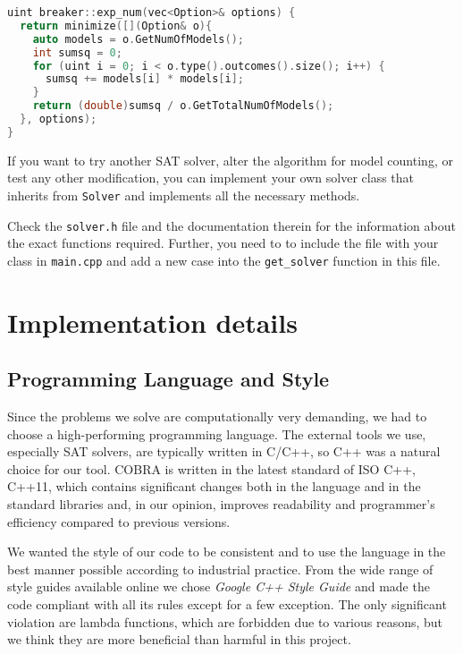 \begin{lstlisting}[language=C++]
uint breaker::exp_num(vec<Option>& options) {
  return minimize([](Option& o){
    auto models = o.GetNumOfModels();
    int sumsq = 0;
    for (uint i = 0; i < o.type().outcomes().size(); i++) {
      sumsq += models[i] * models[i];
    }
    return (double)sumsq / o.GetTotalNumOfModels();
  }, options);
}
\end{lstlisting}

If you want to try another SAT solver, alter the algorithm for model counting,
  or test any other modification,
  you can implement your own solver class that inherits from \texttt{Solver} and
  implements all the necessary methods.

Check the \texttt{solver.h} file and the documentation therein
  for the information about the exact functions required.
Further, you need to to include the file with your class in
  \texttt{main.cpp} and add a new case
  into the \texttt{get\_solver} function in this file.

\section{Implementation details}

\subsection{Programming Language and Style}

Since the problems we solve are computationally very demanding,
  we had to choose a high-performing programming language.
The external tools we use, especially SAT solvers, are typically written in C/C++,
  so C++ was a natural choice for our tool.
COBRA is written in the latest standard of ISO C++, C++11, which
  contains significant changes both in the language and in the standard libraries
  and, in our opinion, improves readability and programmer's efficiency
  compared to previous versions.

We wanted the style of our code to be consistent and to use
  the language in the best manner possible according to industrial practice.
From the wide range of style guides available online
 we chose \emph{Google C++ Style Guide}\cite{googlestyle} and made
 the code compliant with all its rules except for a few exception.
The only significant violation are lambda functions, which are forbidden
due to various reasons,
 but we think they are more beneficial than harmful in this project.

